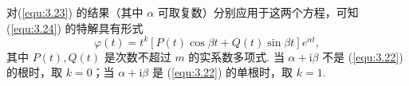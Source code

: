 对(\ref{equ:3.23}) 的结果（其中 $\alpha$ 可取复数）分别应用于这两个方程，可知
(\ref{equ:3.24}) 的特解具有形式
\[
\varphi(t)=t^k\left[P(t)\cos\beta t+Q(t)\sin\beta t\right]e^{\alpha t},
\]
其中 $P(t),Q(t)$ 是次数不超过 $m$ 的实系数多项式. 当
$\alpha+\mathrm{i}\beta$ 不是 (\ref{equ:3.22}) 的根时，取 $k=0$；当
$\alpha+\mathrm{i}\beta$ 是 (\ref{equ:3.22}) 的单根时，取 $k=1$.
